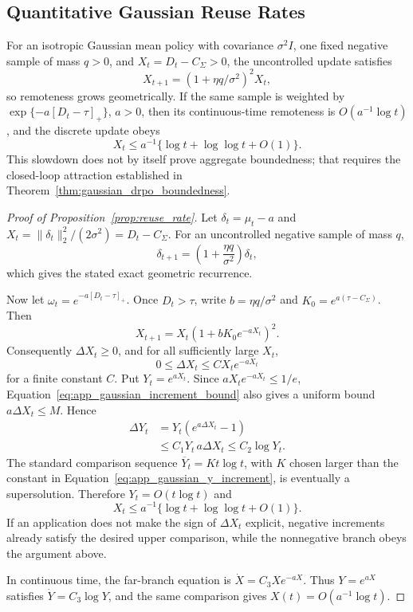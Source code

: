 \documentclass[sigconf,anonymous,review]{acmart}
\theoremstyle{acmdefinition}
\begin{document}
\subsection{Quantitative Gaussian Reuse Rates}
\label{app:gaussian_reuse_rate}

\begin{proposition}
\label{prop:reuse_rate}
For an isotropic Gaussian mean policy with covariance \(\sigma^2I\),
one fixed negative sample of mass \(q>0\), and
\(X_t=D_t-C_\Sigma>0\), the uncontrolled update satisfies
\[
 X_{t+1}=\left(1+\eta q/\sigma^2\right)^2X_t,
\]
so remoteness grows geometrically. If the same sample is weighted by
\(\exp\{-a[D_t-\tau]_+\}\), \(a>0\), then its continuous-time
remoteness is \(O(a^{-1}\log t)\), and the discrete update obeys
\[
 X_t\le a^{-1}\{\log t+\log\log t+O(1)\}.
\]
This slowdown does not by itself prove aggregate boundedness; that requires
the closed-loop attraction established in
Theorem~\ref{thm:gaussian_drpo_boundedness}.
\end{proposition}

\begin{proof}[Proof of Proposition~\ref{prop:reuse_rate}]
Let \(\delta_t=\mu_t-a\) and
\(X_t=\|\delta_t\|_2^2/(2\sigma^2)=D_t-C_\Sigma\).
For an uncontrolled negative sample of mass \(q\),
\[
\delta_{t+1}
=\left(1+\frac{\eta q}{\sigma^2}\right)\delta_t,
\]
which gives the stated exact geometric recurrence.

Now let \(\omega_t=e^{-a[D_t-\tau]_+}\). Once
\(D_t>\tau\), write
\(b=\eta q/\sigma^2\) and
\(K_0=e^{a(\tau-C_\Sigma)}\). Then
\begin{equation}
X_{t+1}=X_t\left(1+bK_0e^{-aX_t}\right)^2.
\label{eq:app_tapered_gaussian_recurrence}
\end{equation}
Consequently \(\Delta X_t\ge0\), and for all sufficiently large
\(X_t\),
\begin{equation}
0\le\Delta X_t\le C X_te^{-aX_t}
\label{eq:app_gaussian_increment_bound}
\end{equation}
for a finite constant \(C\). Put \(Y_t=e^{aX_t}\). Since
\(aX_te^{-aX_t}\le1/e\),
Equation~\eqref{eq:app_gaussian_increment_bound} also gives a uniform
bound \(a\Delta X_t\le M\). Hence
\begin{align}
\Delta Y_t
&=Y_t(e^{a\Delta X_t}-1) \\
&\le C_1Y_t\,a\Delta X_t
\le C_2\log Y_t.
\label{eq:app_gaussian_y_increment}
\end{align}
The standard comparison sequence
\(\overline Y_t=K t\log t\), with \(K\) chosen larger than the
constant in Equation~\eqref{eq:app_gaussian_y_increment}, is eventually
a supersolution. Therefore
\(Y_t=O(t\log t)\) and
\[
X_t\le a^{-1}\{\log t+\log\log t+O(1)\}.
\]
If an application does not make the sign of \(\Delta X_t\) explicit,
negative increments already satisfy the desired upper comparison, while
the nonnegative branch obeys the argument above.

In continuous time, the far-branch equation is
\(\dot X=C_3Xe^{-aX}\). Thus
\(Y=e^{aX}\) satisfies \(\dot Y=C_3\log Y\), and the same comparison
gives \(X(t)=O(a^{-1}\log t)\).
\end{proof}
\end{document}
